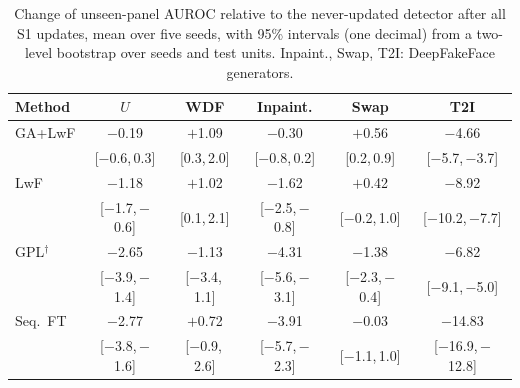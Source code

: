 \documentclass{ieeeaccess}
\begin{document}
\begin{table}[t]
\caption{Change of unseen-panel AUROC relative to the never-updated detector after all S1 updates, mean over five seeds, with 95\% intervals (one decimal) from a two-level bootstrap over seeds and test units. Inpaint., Swap, T2I: DeepFakeFace generators.}
\label{tab:retention}
\centering
\footnotesize
\setlength{\tabcolsep}{0.9pt}
\begin{tabular}{@{}lccccc@{}}
\toprule
Method & $U$ & WDF & Inpaint. & Swap & T2I \\
\midrule
GA+LwF & $-$0.19 & $+$1.09 & $-$0.30 & $+$0.56 & $-$4.66 \\
 & {\scriptsize[$-$0.6,\,0.3]} & {\scriptsize[0.3,\,2.0]} & {\scriptsize[$-$0.8,\,0.2]} & {\scriptsize[0.2,\,0.9]} & {\scriptsize[$-$5.7,\,$-$3.7]} \\[1pt]
LwF & $-$1.18 & $+$1.02 & $-$1.62 & $+$0.42 & $-$8.92 \\
 & {\scriptsize[$-$1.7,\,$-$0.6]} & {\scriptsize[0.1,\,2.1]} & {\scriptsize[$-$2.5,\,$-$0.8]} & {\scriptsize[$-$0.2,\,1.0]} & {\scriptsize[$-$10.2,\,$-$7.7]} \\[1pt]
GPL$^\dagger$ & $-$2.65 & $-$1.13 & $-$4.31 & $-$1.38 & $-$6.82 \\
 & {\scriptsize[$-$3.9,\,$-$1.4]} & {\scriptsize[$-$3.4,\,1.1]} & {\scriptsize[$-$5.6,\,$-$3.1]} & {\scriptsize[$-$2.3,\,$-$0.4]} & {\scriptsize[$-$9.1,\,$-$5.0]} \\[1pt]
Seq.\ FT & $-$2.77 & $+$0.72 & $-$3.91 & $-$0.03 & $-$14.83 \\
 & {\scriptsize[$-$3.8,\,$-$1.6]} & {\scriptsize[$-$0.9,\,2.6]} & {\scriptsize[$-$5.7,\,$-$2.3]} & {\scriptsize[$-$1.1,\,1.0]} & {\scriptsize[$-$16.9,\,$-$12.8]} \\[1pt]
\bottomrule
\end{tabular}
\end{table}
\end{document}
